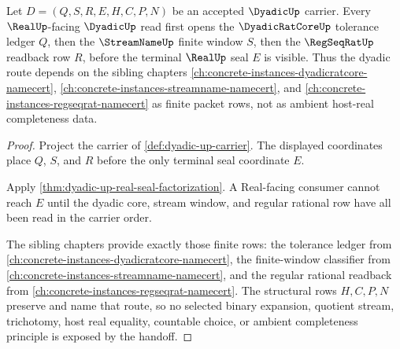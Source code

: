 \begin{theorem}
\label{thm:dyadic-up-streamname-regseqrat-route}
Let $D=(Q,S,R,E,H,C,P,N)$ be an accepted $\DyadicUp$ carrier. Every $\RealUp$-facing $\DyadicUp$ read first opens the $\DyadicRatCoreUp$ tolerance ledger $Q$, then the $\StreamNameUp$ finite window $S$, then the $\RegSeqRatUp$ readback row $R$, before the terminal $\RealUp$ seal $E$ is visible. Thus the dyadic route depends on the sibling chapters \autoref{ch:concrete-instances-dyadicratcore-namecert}, \autoref{ch:concrete-instances-streamname-namecert}, and \autoref{ch:concrete-instances-regseqrat-namecert} as finite packet rows, not as ambient host-real completeness data.
\end{theorem}
\begin{proof}
Project the carrier of \autoref{def:dyadic-up-carrier}. The displayed coordinates place $Q$, $S$, and $R$ before the only terminal seal coordinate $E$.

Apply \autoref{thm:dyadic-up-real-seal-factorization}. A Real-facing consumer cannot reach $E$ until the dyadic core, stream window, and regular rational row have all been read in the carrier order.

The sibling chapters provide exactly those finite rows: the tolerance ledger from \autoref{ch:concrete-instances-dyadicratcore-namecert}, the finite-window classifier from \autoref{ch:concrete-instances-streamname-namecert}, and the regular rational readback from \autoref{ch:concrete-instances-regseqrat-namecert}. The structural rows $H,C,P,N$ preserve and name that route, so no selected binary expansion, quotient stream, trichotomy, host real equality, countable choice, or ambient completeness principle is exposed by the handoff.
\end{proof}

